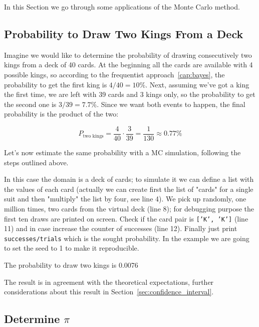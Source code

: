 In this Section we go through some applications of the Monte Carlo method.

\subsection{Probability to Draw Two Kings From a Deck}

Imagine we would like to determine the probability of drawing consecutively two kings from a deck of 40 cards. At the beginning all the cards are available with 4 possible kings, so according to the frequentist approach~\ref{cap:bayes}, the probability to get the first king is $4/40=10\%$. Next, assuming we've got a king the first time, we are left with 39 cards and 3 kings only, so the probability to get the second one is $3/39=7.7\%$. Since we want both events to happen, the final probability is the product of the two:

\begin{equation*}
P_\textrm{two kings} = \frac{4}{40} \cdot \frac{3}{39} = \frac{1}{130} \approx 0.77\%
\end{equation*}

Let's now estimate the same probability with a MC simulation, following the steps outlined above.


In this case the domain is a deck of cards; to simulate it we can define a list with the values of each card (actually we can create first the list of "cards" for a single suit and then "multiply" the list by four, see line 4). We pick up randomly, one million times, two cards from the virtual deck (line 8); for debugging purpose the first ten draws are printed on screen. Check if the card pair is \texttt{['K', 'K']} (line 11) and in case increase the counter of successes (line 12). Finally just print \texttt{successes/trials} which is the sought probability.
In the example we are going to set the seed to 1 to make it reproducible.

\begin{ioutput}
['3' '2']
['2' '3']
['7' '3']
['Q' '4']
['7' '5']
['5' 'J']
['4' 'K']
['K' '2']
['5' 'Q']
['A' 'J']

The probability to draw two kings is 0.0076
\end{ioutput}

The result is in agreement with the theoretical expectations, further considerations about this result in Section~\ref{sec:confidence_interval}.

\subsection{Determine $\pi$}
\label{determine-pi}

